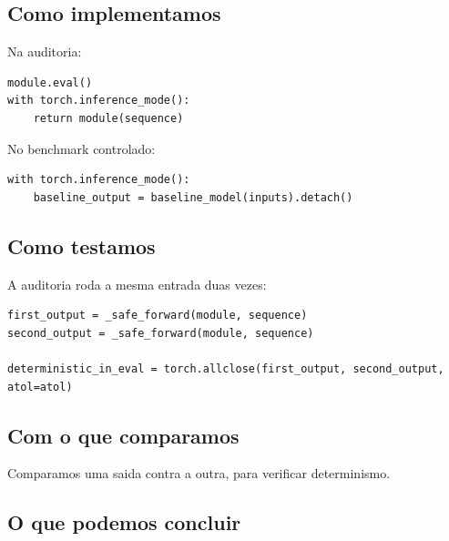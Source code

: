 \subsection{Como implementamos}



Na auditoria:



\begin{Verbatim}[fontsize=\small,breaklines=true,label=python]
module.eval()
with torch.inference_mode():
    return module(sequence)
\end{Verbatim}



No benchmark controlado:



\begin{Verbatim}[fontsize=\small,breaklines=true,label=python]
with torch.inference_mode():
    baseline_output = baseline_model(inputs).detach()
\end{Verbatim}



\subsection{Como testamos}



A auditoria roda a mesma entrada duas vezes:



\begin{Verbatim}[fontsize=\small,breaklines=true,label=python]
first_output = _safe_forward(module, sequence)
second_output = _safe_forward(module, sequence)

deterministic_in_eval = torch.allclose(first_output, second_output, atol=atol)
\end{Verbatim}



\subsection{Com o que comparamos}



Comparamos uma saida contra a outra, para verificar determinismo.



\subsection{O que podemos concluir}




